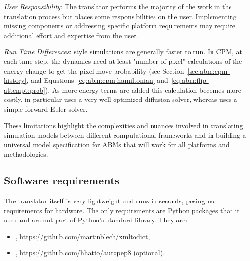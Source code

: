 \textit{User Responsibility}: The translator performs the majority of the work in the translation process but places some responsibilities on the user. Implementing missing components or addressing specific platform requirements may require additional effort and expertise from the user.

\textit{Run Time Differences}: \pscs style simulations are generally faster to run. In CPM, at each time-step, the dynamics need at least "number of pixel" calculations of the energy change to get the pixel move probability (see Section~\ref{sec:abm:cpm-history}, and Equations~\ref{eq:abm:cpm-hamiltonian} and~\ref{eq:abm:flip-attempt:prob}). As more energy terms are added this calculation becomes more costly. \pscs in particular uses a very well optimized diffusion solver, whereas \ccds uses a simple forward Euler solver.

These limitations highlight the complexities and nuances involved in translating simulation models between different computational frameworks and in building a universal model specification for ABMs that will work for all platforms and methodologies.

\subsection{Software requirements}\label{sec:trans:disc:req}
The translator itself is very lightweight and runs in seconds, posing no requirements for hardware. The only requirements are Python packages that it uses and are not part of Python's standard library. They are:

\begin{itemize}
    \item {}, \url{https://github.com/martinblech/xmltodict},
    \item {}, \url{https://github.com/hhatto/autopep8} (optional).
\end{itemize}




